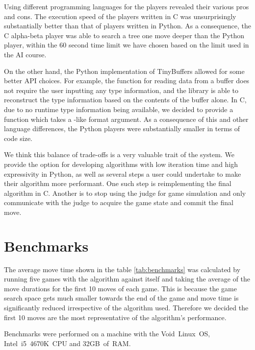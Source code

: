 Using different programming languages for the players revealed their various
pros and cons. The execution speed of the players written in C was
unsurprisingly substantially better than that of players written in Python. As
a consequence, the C alpha-beta player was able to search a tree one move
deeper than the Python player, within the 60 second time limit we have chosen
based on the limit used in the AI course.

On the other hand, the Python implementation of TinyBuffers allowed for some
better API choices. For example, the function for reading data from a buffer
does not require the user inputting any type information, and the library is
able to reconstruct the type information based on the contents of the buffer
alone. In C, due to no runtime type information being available, we decided to
provide a function which takes a -like format argument. As a
consequence of this and other language differences, the Python players were
substantially smaller in terms of code size.

We think this balance of trade-offs is a very valuable trait of the system. We
provide the option for developing algorithms with low iteration time and high
expressivity in Python, as well as several steps a user could undertake to make
their algorithm more performant. One such step is reimplementing the final
algorithm in C. Another is to stop using the judge for game simulation and only
communicate with the judge to acquire the game state and commit the final move.

\section{Benchmarks}

The average move time shown in the table \ref {tab:benchmarks} was calculated
by running five games with the algorithm against itself and taking the average
of the move durations for the first 10 moves of each game. This is because the
game search space gets much smaller towards the end of the game and move time
is significantly reduced irrespective of the algorithm used. Therefore we
decided the first 10 moves are the most representative of the algorithm's
performance.

Benchmarks were performed on a machine with the Void~Linux~OS, Intel~i5~4670K~CPU and 32GB~of~RAM.


